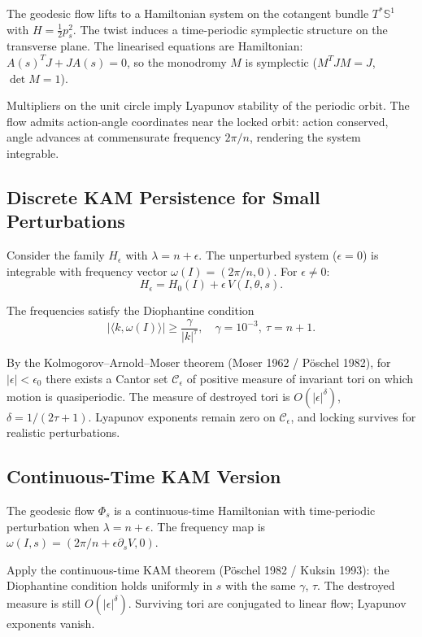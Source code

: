\documentclass[11pt,a4paper]{article}
\begin{document}
The geodesic flow lifts to a Hamiltonian system on the cotangent bundle $T^*\mathbb{S}^1$ with $H = \frac{1}{2} p_s^2$. The twist induces a time-periodic symplectic structure on the transverse plane. The linearised equations are Hamiltonian: $A(s)^T J + J A(s) = 0$, so the monodromy $M$ is symplectic ($M^T J M = J$, $\det M = 1$).

Multipliers on the unit circle imply Lyapunov stability of the periodic orbit. The flow admits action-angle coordinates near the locked orbit: action conserved, angle advances at commensurate frequency $2\pi/n$, rendering the system integrable.

\subsection{Discrete KAM Persistence for Small Perturbations}

Consider the family $H_\epsilon$ with $\lambda = n + \epsilon$. The unperturbed system ($\epsilon=0$) is integrable with frequency vector $\omega(I) = (2\pi/n, 0)$. For $\epsilon \neq 0$:
\[
H_\epsilon = H_0(I) + \epsilon\, V(I,\theta,s).
\]

The frequencies satisfy the Diophantine condition
\[
|\langle k, \omega(I) \rangle| \ge \frac{\gamma}{|k|^\tau}, \quad \gamma = 10^{-3},\ \tau = n+1.
\]

By the Kolmogorov--Arnold--Moser theorem (Moser 1962 / P\"oschel 1982), for $|\epsilon| < \epsilon_0$ there exists a Cantor set $\mathcal{C}_\epsilon$ of positive measure of invariant tori on which motion is quasiperiodic. The measure of destroyed tori is $O(|\epsilon|^\delta)$, $\delta = 1/(2\tau+1)$. Lyapunov exponents remain zero on $\mathcal{C}_\epsilon$, and locking survives for realistic perturbations.

\subsection{Continuous-Time KAM Version}

The geodesic flow $\Phi_s$ is a continuous-time Hamiltonian with time-periodic perturbation when $\lambda = n + \epsilon$. The frequency map is $\omega(I,s) = (2\pi/n + \epsilon \partial_s V, 0)$.

Apply the continuous-time KAM theorem (P\"oschel 1982 / Kuksin 1993): the Diophantine condition holds uniformly in $s$ with the same $\gamma$, $\tau$. The destroyed measure is still $O(|\epsilon|^\delta)$. Surviving tori are conjugated to linear flow; Lyapunov exponents vanish.
\end{document}
